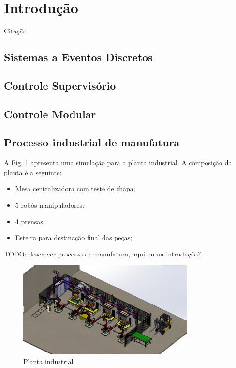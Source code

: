 \section{Introdução}
Citação \cite{Ramadge1989}
\subsection{Sistemas a Eventos Discretos}
\subsection{Controle Supervisório}
\subsection{Controle Modular}

\subsection{Processo industrial de manufatura}
A Fig. \ref{fig:processo} apresenta uma simulação para a planta industrial.
A composição da planta é a seguinte:
\begin{itemize}
    \item Mesa centralizadora com teste de chapa;
    \item 5 robôs manipuladores;
    \item 4 prensas;
    \item Esteira para destinação final das peças;
\end{itemize}

TODO: descrever processo de manufatura, aqui ou na introdução?

\begin{figure}[H]%
    \centering
    \includegraphics[width=0.8\textwidth]{imagens/processo.eps}
    \caption{Planta industrial}\label{fig:processo}
\end{figure}